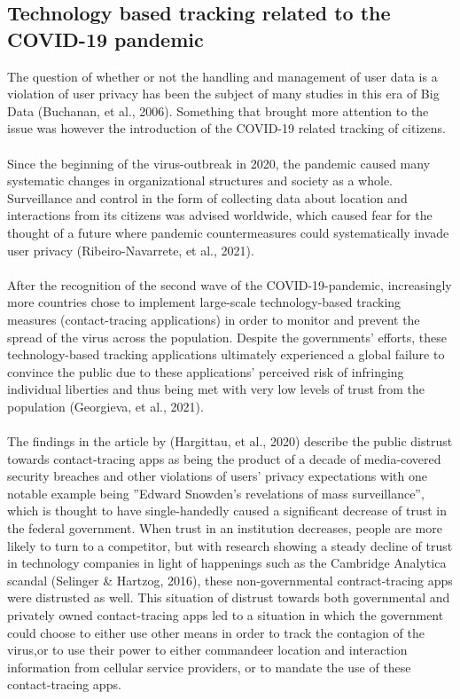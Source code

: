 \documentclass[11pt]{article}
\begin{document}
\subsection{Technology based tracking related to the COVID-19 pandemic}
The question of whether or not the handling and management of user data is a violation of user privacy has been the subject of many studies in this era of Big Data (Buchanan, et al., 2006). Something that brought more attention to the issue was however the introduction of the COVID-19 related tracking of citizens.
\\ \\
Since the beginning of the virus-outbreak in 2020, the pandemic caused many systematic changes in organizational structures and society as a whole. Surveillance and control in the form of collecting data about location and interactions from its citizens was advised worldwide, which caused fear for the thought of a future where pandemic countermeasures could systematically invade user privacy (Ribeiro-Navarrete, et al., 2021). 
\\ \\
After the recognition of the second wave of the COVID-19-pandemic, increasingly more countries chose to implement large-scale technology-based tracking measures (contact-tracing applications) in order to monitor and prevent the spread of the virus across the population. Despite the governments’ efforts, these technology-based tracking applications ultimately experienced a global failure to convince the public due to these applications’ perceived risk of infringing individual liberties and thus being met with very low levels of trust from the population (Georgieva, et al., 2021). 
\\ \\
The findings in the article by (Hargittau, et al., 2020) describe the public distrust towards contact-tracing apps as being the product of a decade of media-covered security breaches and other violations of users’ privacy expectations with one notable example being ”Edward Snowden’s revelations of mass surveillance”, which is thought to have single-handedly caused a significant decrease of trust in the federal government. When trust in an institution decreases, people are more likely to turn to a competitor, but with research showing a steady decline of trust in technology companies in light of happenings such as the Cambridge Analytica scandal (Selinger \& Hartzog, 2016), these non-governmental contract-tracing apps were distrusted as well.
This situation of distrust towards both governmental and privately owned contact-tracing apps led to a situation in which the government could choose to either use other means in order to track the contagion of the virus,or to use their power to either commandeer location and interaction information from cellular service providers, or to mandate the use of these contact-tracing apps.
\end{document}
